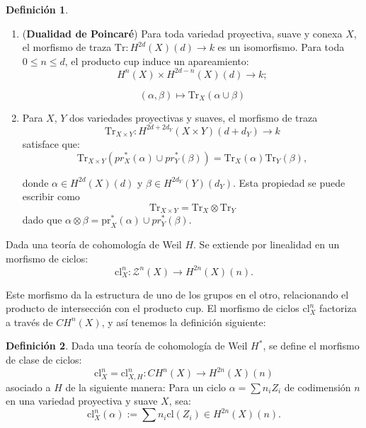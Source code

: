 \documentclass[10pt]{amsart}
\theoremstyle{definition}
\newtheorem{definition}{Definici\'on}[section]
\theoremstyle{remark}
\theoremstyle{definition}
\begin{document}
\begin{definition}
\begin{enumerate}
 \item (\textbf{Dualidad de Poincaré}) Para toda variedad proyectiva, suave y conexa $X$, el morfismo de traza $\mathrm{Tr}:H^{2d}(X)(d) \rightarrow \mathit{k}$ es un isomorfismo. Para toda $0 \leq n \leq d$, el producto cup induce un apareamiento:
\begin{equation*}
H^{n}(X) \times H^{2d-n}(X)(d) \rightarrow \mathit{k};
\end{equation*}

\begin{equation*}
(\alpha,\beta) \mapsto \mathrm{Tr}_{X}(\alpha \cup \beta)
\end{equation*}

\item Para $X$, $Y$ dos variedades proyectivas y suaves, el morfismo de traza
\begin{equation*}
 \mathrm{Tr}_{X\times Y}:H^{2d+2d_{Y}}(X \times Y)(d+d_{Y}) \rightarrow \mathit{k}
\end{equation*}
satisface que:
\begin{equation*}
\mathrm{Tr}_{X \times Y}(pr^{*}_{X}(\alpha) \cup pr^{*}_{Y}(\beta))=\mathrm{Tr}_{X}(\alpha) \mathrm{Tr}_{Y}(\beta),
\end{equation*}

donde $\alpha \in H^{2d}(X)(d)$ y $\beta \in H^{2d_{Y}}(Y)(d_{Y})$. Esta propiedad se puede escribir como 
\begin{equation*}
\mathrm{Tr}_{X \times Y}=\mathrm{Tr}_{X} \otimes \mathrm{Tr}_{Y}
\end{equation*}
dado que $\alpha \otimes \beta = \mathrm{pr}^{*}_{X}(\alpha) \cup pr^{*}_{Y}(\beta)$.


\end{enumerate}
\end{definition}

Dada una teoría de cohomología de Weil $H$. Se extiende por linealidad en un morfismo de ciclos:
\begin{equation*}
\mathrm{cl}^{n}_{X}:\mathcal{Z}^{n}(X) \rightarrow H^{2n}(X)(n).
\end{equation*}

Este morfismo da la estructura de uno de los grupos en el otro, relacionando el producto de intersección con el producto cup. El morfismo de ciclos $\mathrm{cl}^{n}_{X}$ factoriza a través de $CH^{n}(X)$, y así tenemos la definición siguiente:
\begin{definition} Dada una teoría de cohomología de Weil $H^{*}$, se define el morfismo de clase de ciclos:
\begin{equation*}
\mathrm{cl}^{n}_{X}=\mathrm{cl}^{n}_{X,H}:CH^{n}(X) \rightarrow H^{2n}(X)(n)
\end{equation*}
asociado a $H$ de la siguiente manera: Para un ciclo $\alpha=\sum n_{i}Z_{i}$ de codimensión $n$ en una variedad proyectiva y suave $X$, sea:
\begin{equation*}
\mathrm{cl}^{n}_{X}(\alpha):=\sum n_{i}\mathrm{cl}(Z_{i}) \in H^{2n}(X)(n).
\end{equation*}
\end{definition}
\end{document}
